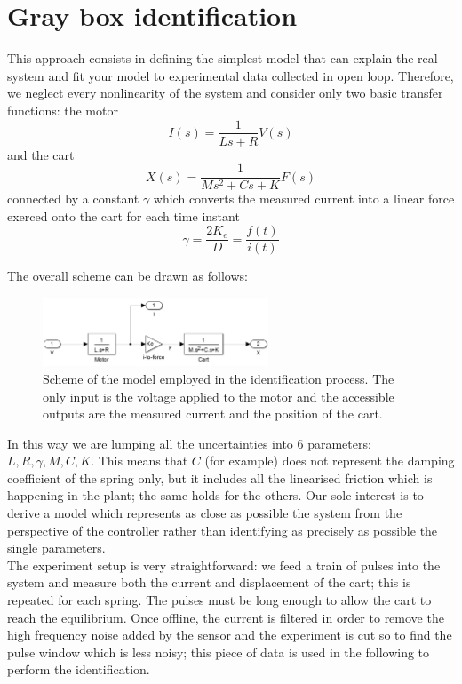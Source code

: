 \chapter{Gray box identification}
This approach consists in defining the simplest model that can explain the real system and fit your model to experimental data collected in open loop. Therefore, we neglect every nonlinearity of the system and consider only two basic transfer functions: the motor
\begin{equation}
I(s) = \frac{1}{Ls+R} V(s)
\end{equation}
and the cart
\begin{equation}
X(s) = \frac{1}{Ms^2+Cs+K} F(s)
\end{equation}
connected by a constant $\gamma$ which converts the measured current into a linear force exerced onto the cart for each time instant
\begin{equation}
\gamma = \frac{2K_e}{D}=\frac{f(t)}{i(t)}
\end{equation}

The overall scheme can be drawn as follows:
\begin{figure}
\centering
\includegraphics[width=0.6\textwidth]{img/graybox_scheme.png}
\caption{Scheme of the model employed in the identification process. The only input is the voltage applied to the motor and the accessible outputs are the measured current and the position of the cart.}
\end{figure}

In this way we are lumping all the uncertainties into 6 parameters: $L, R, \gamma, M, C, K$. This means that $C$ (for example) does not represent the damping coefficient of the spring only, but it includes all the linearised friction which is happening in the plant; the same holds for the others. Our sole interest is to derive a model which represents as close as possible the system from the perspective of the controller rather than identifying as precisely as possible the single parameters.\\

The experiment setup is very straightforward: we feed a train of pulses into the system and measure both the current and displacement of the cart; this is repeated for each spring. The pulses must be long enough to allow the cart to reach the equilibrium. Once offline, the current is filtered in order to remove the high frequency noise added by the sensor and the experiment is cut so to find the pulse window which is less noisy; this piece of data is used in the following to perform the identification.\\

